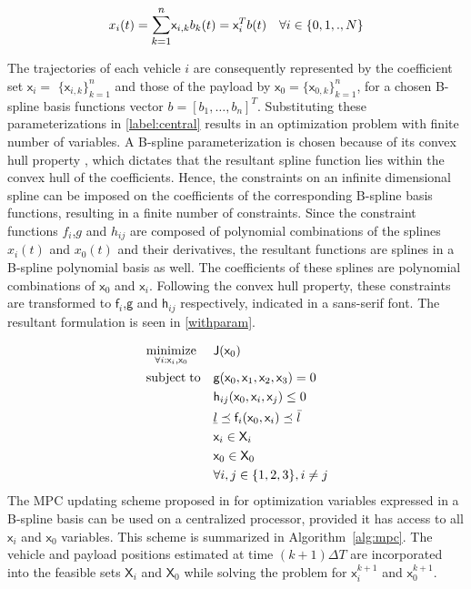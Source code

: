 \documentclass[letterpaper, 10 pt, conference]{ieeeconf}
\newcommand{\ubar}[1]{\text{\b{$#1$}}}
\DeclareMathOperator*{\minimize}{minimize}
\DeclareMathOperator*{\subj}{subject\;to}
\newcommand{\cx}{\textsf{x}}
\newcommand{\J}{\textsf{J}}
\newcommand{\cf}{\textsf{f}}
\newcommand{\cg}{\textsf{g}}
\newcommand{\ch}{\textsf{h}}
\newcommand{\X}{\textsf{X}}
\begin{document}
\begin{equation}\label{spline}
x_i(t) = \mathlarger{\sum\limits_{k=1}^{n}} \cx_{i,k}b_k(t) = \cx_i^Tb(t) \quad \forall i \in \{0,1,.,N\}
\end{equation}

 The trajectories of each vehicle $i$ are consequently represented by the coefficient set $\cx_i$$=$ $\{\cx_{i,k}\}_{k=1}^{n}$ and those of the payload by $\cx_0$$=$$\{\cx_{0,k}\}_{k=1}^{n}$, for a chosen B-spline basis functions vector $b = [b_1,\ldots,b_n]^T$. Substituting these parameterizations in \eqref{label:central} results in an optimization problem with finite number of variables. A B-spline parameterization is chosen because of its convex hull property \cite{c15}, which dictates that the resultant spline function lies within the convex hull of the coefficients. Hence, the constraints on an infinite dimensional spline can be imposed on the coefficients of the corresponding B-spline basis functions, resulting in a finite number of constraints. Since the constraint functions $f_i$,$g$ and $h_{ij}$ are composed of polynomial combinations of the splines $x_i(t)$ and $x_0(t)$ and their derivatives, the resultant functions are splines in a B-spline polynomial basis as well. The coefficients of these splines are polynomial combinations of $\cx_0$ and $\cx_i$. Following the convex hull property, these constraints are transformed to $\cf_i$,$\cg$ and $\ch_{ij}$ respectively, indicated in a sans-serif font.
The resultant formulation is seen in \eqref{withparam}. 

 \begin{equation}
   \label{withparam}
   \begin{aligned}
     & \minimize_{\forall i:\cx_i,\cx_0} &&  \J(\cx_0) \\
     & \subj
     &      & \cg(\cx_0,\cx_1,\cx_2,\cx_3) = 0 \\
     &        && \ch_{ij}(\cx_0,\cx_i,\cx_j) \leq 0 \\
     &	&& \ubar{l} \preceq \cf_i(\cx_0,\cx_i) \preceq \bar{l}\\
     &        && \cx_i \in \X_i \\
     &        && \cx_0 \in \X_0 \\
     &                                && \forall i,j \in \{1,2,3\}, i \neq j
   \end{aligned}
 \end{equation}
 The MPC updating scheme proposed in \cite{c16} for optimization variables expressed in a B-spline basis can be used on a centralized processor, provided it has access to all $\cx_i$ and $\cx_0$ variables. This scheme is summarized in Algorithm~\ref{alg:mpc}. The vehicle and payload positions estimated at time $(k+1)\Delta T$ are incorporated into the feasible sets $\X_i$ and $\X_0$ while solving the problem for $\cx_i^{k+1}$ and $\cx_0^{k+1}$.
\end{document}
